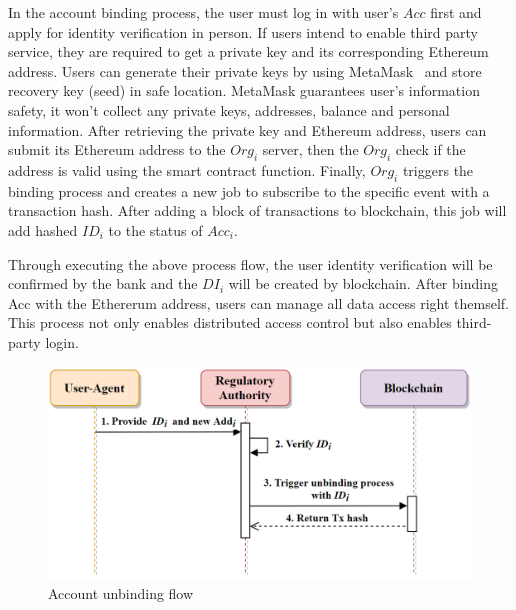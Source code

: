     In the account binding process, the user must log in with user's \(Acc\) first and apply for identity verification in person. If users intend to enable third party service, they are required to get a private key and its corresponding Ethereum address. Users can generate their private keys by using MetaMask~\cite{metamask} and store recovery key (seed) in safe location. MetaMask guarantees user's information safety, it won't collect any private keys, addresses, balance and personal information. After retrieving the private key and Ethereum address, users can submit its Ethereum address to the \(Org_i\) server, then the \(Org_i\) check if the address is valid using the smart contract function. Finally, \(Org_i\) triggers the binding process and creates a new job to subscribe to the specific event with a transaction hash. After adding a block of transactions to blockchain, this job will add hashed \(ID_i\) to the status of \(Acc_i\).\par
    Through executing the above process flow, the user identity verification will be confirmed by the bank and the \(DI_i\) will be created by blockchain. After binding Acc with the Ethererum address, users can manage all data access right themself. This process not only enables distributed access control but also enables third-party login.

    \newpage

    \begin{figure}[htb]
        \centering
        \includegraphics[height=!,width=0.8\linewidth,keepaspectratio=true]{figures/account_unbinding.png}
        \caption{{\footnotesize Account unbinding flow}}
        \label{fig:accountunBinding}
    \end{figure}

